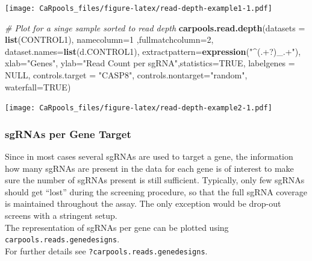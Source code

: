 \documentclass[]{article}
\newenvironment{Shaded}{\begin{snugshade}}{\end{snugshade}}
\newcommand{\KeywordTok}[1]{\textcolor[rgb]{0.13,0.29,0.53}{\textbf{{#1}}}}
\newcommand{\DataTypeTok}[1]{\textcolor[rgb]{0.13,0.29,0.53}{{#1}}}
\newcommand{\DecValTok}[1]{\textcolor[rgb]{0.00,0.00,0.81}{{#1}}}
\newcommand{\StringTok}[1]{\textcolor[rgb]{0.31,0.60,0.02}{{#1}}}
\newcommand{\CommentTok}[1]{\textcolor[rgb]{0.56,0.35,0.01}{\textit{{#1}}}}
\newcommand{\OtherTok}[1]{\textcolor[rgb]{0.56,0.35,0.01}{{#1}}}
\newcommand{\NormalTok}[1]{{#1}}
\begin{document}
\texttt{[image: CaRpools\_files/figure-latex/read-depth-example1-1.pdf]}

\begin{Shaded}
\begin{Highlighting}[]
\CommentTok{# Plot for a singe sample sorted to read depth}
\KeywordTok{carpools.read.depth}\NormalTok{(}\DataTypeTok{datasets =} \KeywordTok{list}\NormalTok{(CONTROL1), }\DataTypeTok{namecolumn=}\DecValTok{1} \NormalTok{,}\DataTypeTok{fullmatchcolumn=}\DecValTok{2}\NormalTok{,}
  \DataTypeTok{dataset.names=}\KeywordTok{list}\NormalTok{(d.CONTROL1), }\DataTypeTok{extractpattern=}\KeywordTok{expression}\NormalTok{(}\StringTok{"^(.+?)_.+"}\NormalTok{),}
  \DataTypeTok{xlab=}\StringTok{"Genes"}\NormalTok{, }\DataTypeTok{ylab=}\StringTok{"Read Count per sgRNA"}\NormalTok{,}\DataTypeTok{statistics=}\OtherTok{TRUE}\NormalTok{, }\DataTypeTok{labelgenes =} \OtherTok{NULL}\NormalTok{,}
  \DataTypeTok{controls.target =} \StringTok{"CASP8"}\NormalTok{, }\DataTypeTok{controls.nontarget=}\StringTok{"random"}\NormalTok{, }\DataTypeTok{waterfall=}\OtherTok{TRUE}\NormalTok{)}
\end{Highlighting}
\end{Shaded}

\texttt{[image: CaRpools\_files/figure-latex/read-depth-example2-1.pdf]}

\subsubsection{sgRNAs per Gene Target}\label{sgrnas-per-gene-target}

Since in most cases several sgRNAs are used to target a gene, the
information how many sgRNAs are present in the data for each gene is of
interest to make sure the number of sgRNAs present is still sufficient.
Typically, only few sgRNAs should get ``lost'' during the screening
procedure, so that the full sgRNA coverage is maintained throughout the
assay. The only exception would be drop-out screens with a stringent
setup.\\
The representation of sgRNAs per gene can be plotted using
\texttt{carpools.reads.genedesigns}.\\
For further details see \texttt{?carpools.reads.genedesigns}.

\begin{Shaded}
\end{Shaded}
\end{document}
